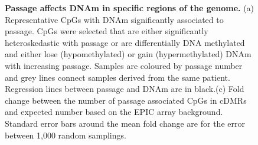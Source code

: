 \documentclass[a4paper]{article}
\begin{document}
\begin{figure}
\begin{centering}
\hfil
{}

\caption{\textbf{Passage affects DNAm in specific regions of the genome.} (a) Representative CpGs with DNAm significantly associated to passage. CpGs were selected that are either significantly heteroskedastic with passage or are differentially DNA methylated and either lose (hypomethylated) or gain (hypermethylated) DNAm with increasing passage. Samples are coloured by passage number and grey lines connect samples derived from the same patient. Regression lines between passage and DNAm are in black.(c) Fold change between the number of passage associated CpGs in cDMRs and expected number based on the EPIC array background. Standard error bars around the mean fold change are for the error between 1,000 random samplings.}

\label{fig:main}
\end{centering}
\end{figure}
\end{document}
